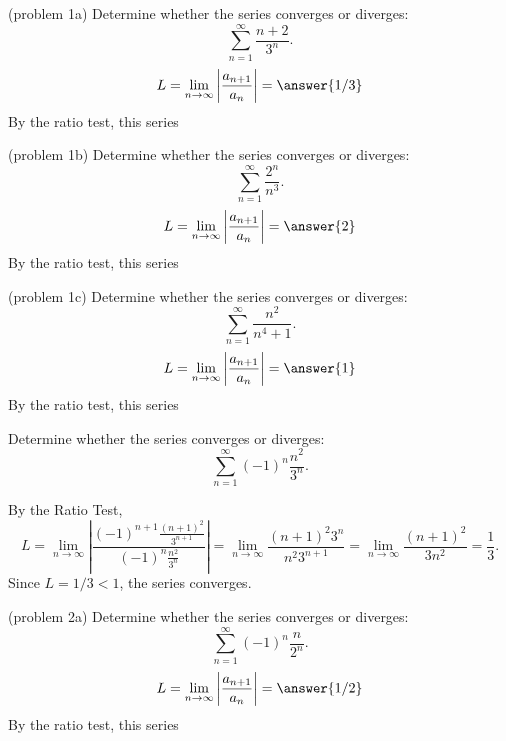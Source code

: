 \documentclass[handout]{ximera}
\begin{document}
\begin{problem}(problem 1a)
Determine whether the series converges or diverges:
\[
\sum_{n=1}^\infty \frac{n+2}{3^n}.
\]
\[
L = \lim_{n \to \infty} \left|\frac{a_{n+1}}{a_n}\right| = \answer{1/3}
\]
By the ratio test, this series 

\end{problem}


\begin{problem}(problem 1b)
Determine whether the series converges or diverges:
\[
\sum_{n=1}^\infty \frac{2^n}{n^3}.
\]
\[
L = \lim_{n \to \infty} \left|\frac{a_{n+1}}{a_n}\right| = \answer{2}
\]
By the ratio test, this series 

\end{problem}



\begin{problem}(problem 1c)
Determine whether the series converges or diverges:
\[
\sum_{n=1}^\infty \frac{n^2}{n^4 +1}.
\]
\[
L = \lim_{n \to \infty} \left|\frac{a_{n+1}}{a_n}\right| = \answer{1}
\]
By the ratio test, this series 

\end{problem}


\begin{example}[example 2]
Determine whether the series converges or diverges:
\[
\sum_{n=1}^\infty (-1)^n\frac{n^2}{3^n}.
\]

By the Ratio Test,
\[
L =  \lim_{n \to \infty} \left|\frac{(-1)^{n+1}\frac{(n+1)^2}{3^{n+1}}}{(-1)^n\frac{n^2}{3^n}}\right| =  \lim_{n \to \infty} \frac{(n+1)^2 3^n}{n^2 3^{n+1}} 
=  \lim_{n \to \infty} \frac{(n+1)^2}{3n^2} = \frac13.
\]
Since $L = 1/3 < 1$, the series converges.
\end{example}





\begin{problem}(problem 2a)
Determine whether the series converges or diverges:
\[
\sum_{n=1}^\infty (-1)^n\frac{n}{2^n}.
\]
\[
L = \lim_{n \to \infty} \left|\frac{a_{n+1}}{a_n}\right| = \answer{1/2}
\]
By the ratio test, this series 

\end{problem}
\end{document}
